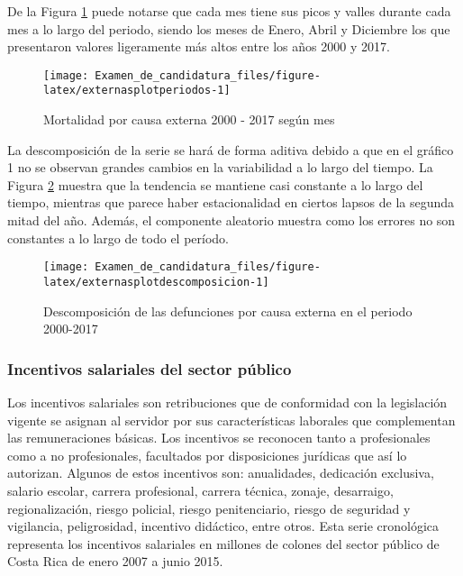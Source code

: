 \documentclass[
]{article}
\begin{document}
De la Figura \ref{fig:externasplotperiodos} puede notarse que cada mes
tiene sus picos y valles durante cada mes a lo largo del periodo, siendo
los meses de Enero, Abril y Diciembre los que presentaron valores
ligeramente más altos entre los años 2000 y 2017.

\begin{figure}[H]
\texttt{[image: Examen\_de\_candidatura\_files/figure-latex/externasplotperiodos-1]} \caption{Mortalidad por causa externa 2000 - 2017 según mes}\label{fig:externasplotperiodos}
\end{figure}

La descomposición de la serie se hará de forma aditiva debido a que en
el gráfico 1 no se observan grandes cambios en la variabilidad a lo
largo del tiempo. La Figura \ref{fig:externasplotdescomposicion} muestra
que la tendencia se mantiene casi constante a lo largo del tiempo,
mientras que parece haber estacionalidad en ciertos lapsos de la segunda
mitad del año. Además, el componente aleatorio muestra como los errores
no son constantes a lo largo de todo el período.

\begin{figure}[H]
\texttt{[image: Examen\_de\_candidatura\_files/figure-latex/externasplotdescomposicion-1]} \caption{Descomposición de las defunciones por causa externa en el periodo 2000-2017}\label{fig:externasplotdescomposicion}
\end{figure}

\subsubsection{Incentivos salariales del sector público}

Los incentivos salariales son retribuciones que de conformidad con la
legislación vigente se asignan al servidor por sus características
laborales que complementan las remuneraciones básicas. Los incentivos se
reconocen tanto a profesionales como a no profesionales, facultados por
disposiciones jurídicas que así lo autorizan. Algunos de estos
incentivos son: anualidades, dedicación exclusiva, salario escolar,
carrera profesional, carrera técnica, zonaje, desarraigo,
regionalización, riesgo policial, riesgo penitenciario, riesgo de
seguridad y vigilancia, peligrosidad, incentivo didáctico, entre otros.
Esta serie cronológica representa los incentivos salariales en millones
de colones del sector público de Costa Rica de enero 2007 a junio 2015.
\end{document}
